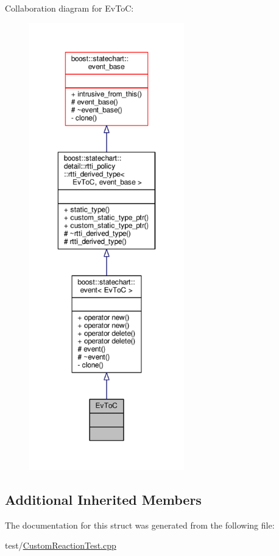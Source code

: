 Collaboration diagram for Ev\+ToC\+:
\nopagebreak
\begin{figure}[H]
\begin{center}
\leavevmode
\includegraphics[height=550pt]{struct_ev_to_c__coll__graph}
\end{center}
\end{figure}
\subsection*{Additional Inherited Members}


The documentation for this struct was generated from the following file\+:\begin{DoxyCompactItemize}
\item 
test/\mbox{\hyperlink{_custom_reaction_test_8cpp}{Custom\+Reaction\+Test.\+cpp}}\end{DoxyCompactItemize}
